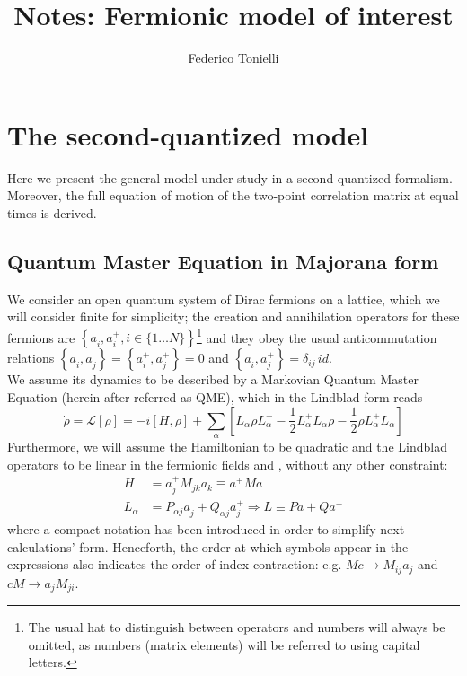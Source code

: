 \documentclass[a4paper,11pt]{article}
\title{Notes: Fermionic model of interest}
\author{Federico Tonielli}
\newcommand\blankpage{%
    \null
    \thispagestyle{empty}%
    \addtocounter{page}{-1}%
    \newpage}
\newcommand{\ro}{\rho}
\begin{document}
 \maketitle
 
 \tableofcontents
 \blankpage
 
 \section{The second-quantized model}
 Here we present the general model under study in a second quantized formalism.  Moreover, the full equation of motion of the two-point correlation matrix at equal times is derived.
 
  \subsection{Quantum Master Equation in Majorana form}
   We consider an open quantum system of Dirac fermions on a lattice, which we will consider finite for simplicity; the creation and annihilation operators for these fermions are $\left \{ a_i^{ },a_i^+, i\in \{1\dots N\} \right \} $\footnote{ The usual hat to distinguish between operators and numbers will always be omitted, as numbers (matrix elements) will be referred to using capital letters.} and they obey the usual anticommutation relations $\left\{a_i^{ },a_j^{ }\right\} = \left\{a_i^{+},a_j^+\right \}=0$ and $\left\{a_i^{ },a_j^+\right \} = \delta_{ij}\,id $.\\  We assume its dynamics to be described by a Markovian Quantum Master Equation (herein after referred as QME), which in the Lindblad form reads
  \[\dot{\ro}=\mathcal{L}[\ro]=-i\left[H,\ro\right]+\sum_{\alpha}\left[L_{\alpha}^{ }\ro L_{\alpha}^+ - \frac{1}{2}L_{\alpha}^+L_{\alpha}^{ }\ro - \frac{1}{2}\ro L_{\alpha}^+L_{\alpha}^{ }\right]  \]
  Furthermore, we will assume the Hamiltonian to be quadratic and the Lindblad operators to be linear in the fermionic fields  and , without any other constraint: 
  \begin{subequations}
  \renewcommand{\theequation}{\theparentequation.\arabic{equation}}
  \begin{align}
   H & = a_j^+M_{jk}a_k^{ } \equiv a^+Ma \\ 
   L_{\alpha} & = P^{ }_{\alpha j}a_j^{ } + Q^{ }_{\alpha j}a_j^+ \Rightarrow L \equiv P a + Q a^+
   \label{eq:quadr_dyn}
  \end{align}
  \end{subequations}
 where a compact notation has been introduced in order to simplify next calculations' form. Henceforth, the order at which symbols appear in the expressions also indicates the order of index contraction: e.g. $Mc\rightarrow M_{ij}a_j$ and $cM \rightarrow a_j M_{ji}$. \\
\end{document}
